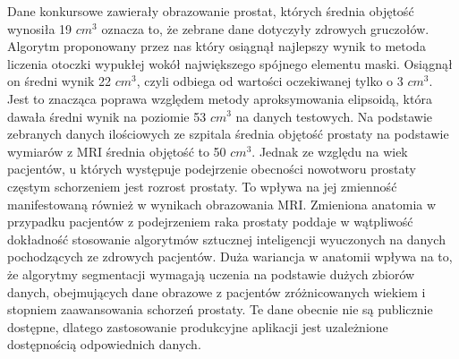 \documentclass[a4paper,11pt,twoside]{report}
\theoremstyle{definition}
\begin{document}
Dane konkursowe zawierały obrazowanie prostat, których średnia objętość wynosiła 19 $cm^3$ oznacza to, że zebrane dane dotyczyły zdrowych gruczołów. Algorytm proponowany przez nas który osiągnął najlepszy wynik to metoda liczenia otoczki wypukłej wokół największego spójnego elementu maski. Osiągnął on średni wynik 22 $cm^3$, czyli odbiega od wartości oczekiwanej tylko o 3 $cm^3$. Jest to znacząca poprawa względem metody aproksymowania elipsoidą, która dawała średni wynik na poziomie 53 $cm^3$ na danych testowych. Na podstawie zebranych danych ilościowych ze szpitala średnia objętość prostaty na podstawie wymiarów z MRI średnia objętość to 50 $cm^3$. Jednak ze względu na wiek pacjentów, u których występuje podejrzenie obecności nowotworu prostaty częstym schorzeniem jest rozrost prostaty. To wpływa na jej zmienność manifestowaną również w wynikach obrazowania MRI. Zmieniona anatomia w przypadku pacjentów z podejrzeniem raka prostaty poddaje w wątpliwość dokładność stosowanie algorytmów sztucznej inteligencji wyuczonych na danych pochodzących ze zdrowych pacjentów. Duża wariancja w anatomii wpływa na to, że algorytmy segmentacji wymagają uczenia na podstawie dużych zbiorów danych, obejmujących dane obrazowe z pacjentów zróżnicowanych wiekiem i stopniem zaawansowania schorzeń prostaty. Te dane obecnie nie są publicznie dostępne, dlatego zastosowanie produkcyjne aplikacji jest uzależnione dostępnością odpowiednich danych.

\end{document}
